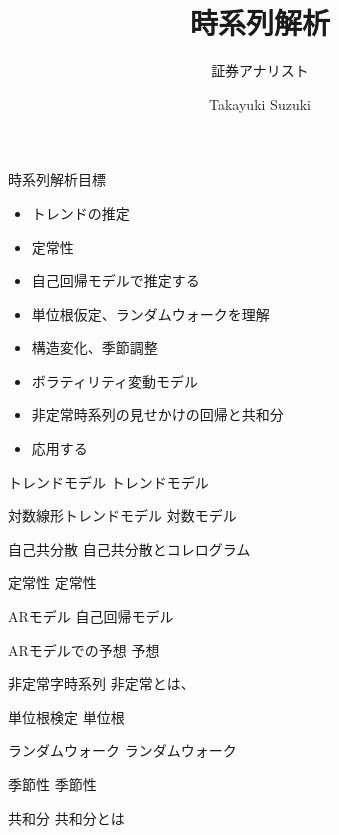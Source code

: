 \documentclass[dvipdfmx,autodetect-engine, unicode, 10pt, aspectratio=169]{beamer}
\title{時系列解析}
\subtitle{証券アナリスト}
\date{}
\author{Takayuki Suzuki}
\institute{This is institude of the author}
\begin{document}
\maketitle


\begin{frame}{時系列解析目標}
    \begin{itemize}
        \item トレンドの推定
        \item 定常性
        \item 自己回帰モデルで推定する
        \item 単位根仮定、ランダムウォークを理解
        \item 構造変化、季節調整
        \item ボラティリティ変動モデル
        \item 非定常時系列の見せかけの回帰と共和分
        \item 応用する
    \end{itemize}
\end{frame}

\begin{frame}{トレンドモデル}
    トレンドモデル
\end{frame}
\begin{frame}{対数線形トレンドモデル}
    対数モデル
\end{frame}
\begin{frame}{自己共分散}
    自己共分散とコレログラム
\end{frame}
\begin{frame}{定常性}
    定常性
\end{frame}
\begin{frame}{ARモデル}
    自己回帰モデル
\end{frame}
\begin{frame}{ARモデルでの予想}
    予想
\end{frame}
\begin{frame}{非定常字時系列}
    非定常とは、
\end{frame}
\begin{frame}{単位根検定}
    単位根
\end{frame}
\begin{frame}{ランダムウォーク}
    ランダムウォーク
\end{frame}
\begin{frame}{季節性}
    季節性
\end{frame}
\begin{frame}{共和分}
    共和分とは
\end{frame}
\end{document}
